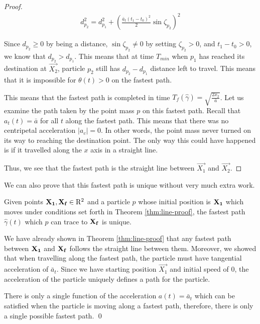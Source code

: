 \begin{proof}
\begin{eqnarray}
d_{p_2}^2 = d_{p_1}^2 + \left(\frac{\bar{a}_t (t_1 - t_0)^2}{2} \sin \zeta_{p_2} \right)^2
\end{eqnarray}

Since $d_{p_2} \geq 0$ by being a distance, $\sin \zeta_{p_2} \neq 0$ by setting $\zeta_{p_2} > 0$, and $t_1 - t_0 > 0$, we know that $d_{p_2} > d_{p_1}$. This means that at time $T_{min}$ when $p_1$ has reached its destination at $\Vec{X_2}$, particle $p_2$ still has $d_{p_2} - d_{p_1}$ distance left to travel. This means that it is impossible for $\theta(t) > 0$ on the fastest path.

This means that the fastest path is completed in time $T_f(\hat{\gamma}) = \sqrt{\frac{2 x_2}{\bar{a}}}$. Let us examine the path taken by the point mass $p$ on this fastest path. Recall that $a_t(t) = \bar{a}$ for all $t$ along the fastest path. This means that there was no centripetal acceleration $|a_c| = 0$. In other words, the point mass never turned on its way to reaching the destination point. The only way this could have happened is if it travelled along the $x$ axis in a straight line.

Thus, we see that the fastest path is the straight line between $\vec{X_1}$ and $\vec{X_2}$.
\end{proof}

We can also prove that this fastest path is unique without very much extra work.

\begin{corollary}
  Given points $\mathbf{X_1}, \mathbf{X_f} \in \mathrm{R}^2$ and a particle $p$ whose initial position is $\mathbf{X_1}$ which moves under conditions set forth in Theorem \ref{thm:line-proof}, the fastest path $\hat{\gamma}(t)$ which $p$ can trace to $\mathbf{X_f}$ is unique.
\end{corollary}
\proof We have already shown in Theorem \ref{thm:line-proof} that any fastest path between $\mathbf{X_1}$ and $\mathbf{X_f}$ follows the straight line between them. Moreover, we showed that when travelling along the fastest path, the particle must have tangential acceleration of $\bar{a}_t$. Since we have starting position $\vec{X_1}$ and initial speed of $0$, the acceleration of the particle uniquely defines a path for the particle.

There is only a single function of the acceleration $a(t) = \bar{a}_t$ which can be satisfied when the particle is moving along a fastest path, therefore, there is only a single possible fastest path.
\qed

